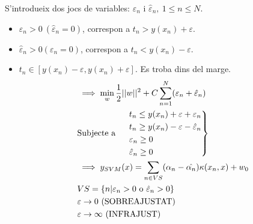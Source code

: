 S'introdueix dos jocs de variables: $\varepsilon_n$ i $\hat{\varepsilon}_n, \ 1 \le n \le N$.

\begin{itemize}
	\item $\varepsilon_n > 0 \ (\hat{\varepsilon}_n = 0)$, correspon a $t_n > y(x_n) + \varepsilon$. 
	\item $\hat{\varepsilon}_n > 0 (\varepsilon_n = 0)$, correspon a $t_n < y(x_n) - \varepsilon$.
	\item $t_n \in [ y(x_n) - \varepsilon, y(x_n) + \varepsilon]$. Es troba dins del marge.
	\begin{align*}
		& \implies \min_w \frac{1}{2}||w||^2 + C \sum_{n=1}^N (\varepsilon_n + \hat{\varepsilon}_n) \\
		& \text{Subjecte a } 
		\begin{rcases}
			& t_n \le y (x_n) + \varepsilon + \varepsilon_n \\
			& t_n \ge y(x_n) - \varepsilon - \hat{\varepsilon}_n \\
			& \varepsilon_n \ge 0 \\
			& \hat{\varepsilon}_n \ge 0
		\end{rcases} \\
		& \implies y_{SVM}(x) = \sum_{n \in VS} (\alpha_n - \hat{\alpha_n})\kappa(x_n, x) + w_0 \\
		& VS = \{ n | \varepsilon_n > 0 \text{ o } \hat{\varepsilon}_n > 0 \} \\
		& \varepsilon \to 0 \ \text{(SOBREAJUSTAT)} \\
		& \varepsilon \to \infty \ \text{(INFRAJUST)}
	\end{align*}
\end{itemize}
